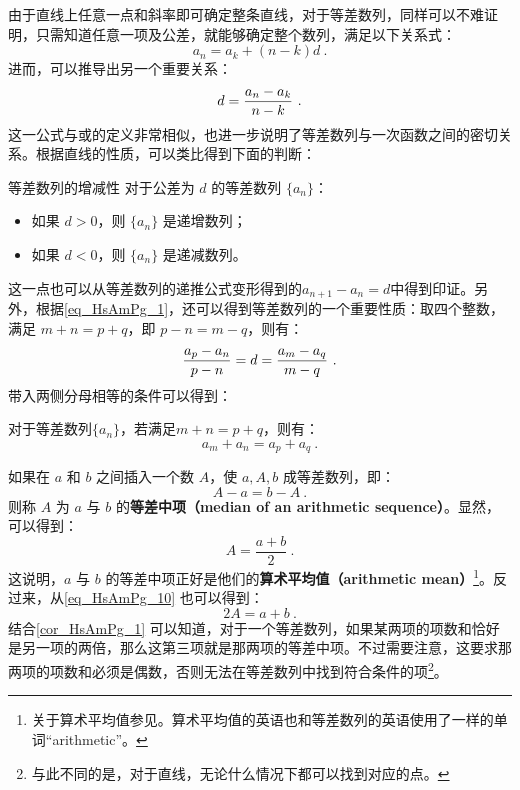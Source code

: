 由于直线上任意一点和斜率即可确定整条直线，对于等差数列，同样可以不难证明，只需知道任意一项及公差，就能够确定整个数列，满足以下关系式：
\begin{equation}
a_n=a_k+(n-k)d~.
\end{equation}
进而，可以推导出另一个重要关系：
\begin{equation}\label{eq_HsAmPg_1}
d={a_n-a_k\over n-k}~.
\end{equation}
这一公式与或的定义非常相似，也进一步说明了等差数列与一次函数之间的密切关系。根据直线的性质，可以类比得到下面的判断：

\begin{corollary}{等差数列的增减性}\label{cor_HsAmPg_2}
对于公差为 $d$ 的等差数列 $\{a_n\}$：
\begin{itemize}
\item 如果 $d > 0$，则 $\{a_n\}$ 是递增数列；
\item 如果 $d < 0$，则 $\{a_n\}$ 是递减数列。
\end{itemize}
\end{corollary}

这一点也可以从等差数列的递推公式变形得到的$a_{n+1}-a_n=d$中得到印证。另外，根据\autoref{eq_HsAmPg_1}，还可以得到等差数列的一个重要性质：取四个整数，满足 $m+n=p+q$，即 $p-n=m-q$，则有：
\begin{equation}
{a_p-a_n\over p-n}=d={a_m-a_q\over m-q}~.
\end{equation}
带入两侧分母相等的条件可以得到：
\begin{corollary}{}\label{cor_HsAmPg_1}
对于等差数列$\{a_n\}$，若满足$m+n=p+q$，则有：
\begin{equation}
a_m+a_n=a_p+a_q~.
\end{equation}
\end{corollary}

如果在 $a$ 和 $b$ 之间插入一个数 $A$，使 $a, A, b$ 成等差数列，即：
\begin{equation}\label{eq_HsAmPg_10}
A - a = b - A~.
\end{equation}
则称 $A$ 为 $a$ 与 $b$ 的\textbf{等差中项（median of an arithmetic sequence）}。显然，可以得到：
\begin{equation}
A = \frac{a+b}{2}~.
\end{equation}
这说明，$a$ 与 $b$ 的等差中项正好是他们的\textbf{算术平均值（arithmetic mean）}\footnote{关于算术平均值参见。算术平均值的英语也和等差数列的英语使用了一样的单词“arithmetic”。}。反过来，从\autoref{eq_HsAmPg_10} 也可以得到：
\begin{equation}
2A = a+b~.
\end{equation}
结合\autoref{cor_HsAmPg_1} 可以知道，对于一个等差数列，如果某两项的项数和恰好是另一项的两倍，那么这第三项就是那两项的等差中项。不过需要注意，这要求那两项的项数和必须是偶数，否则无法在等差数列中找到符合条件的项\footnote{与此不同的是，对于直线，无论什么情况下都可以找到对应的点。}。

